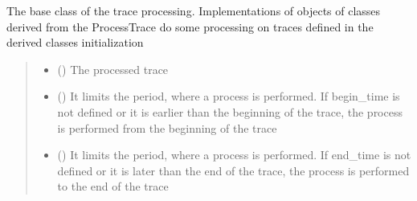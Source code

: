\documentclass[letterpaper,10pt,english]{sphinxmanual}
\begin{document}
\begin{fulllineitems}
\label{\detokenize{api_core:amw.core.utils.ProcessTrace}}
\pysigstartsignatures
{}
\pysigstopsignatures
\sphinxAtStartPar
The base class of the trace processing. Implementations of objects of classes derived from the ProcessTrace
do some processing on traces defined in the derived classes initialization
\begin{quote}\begin{description}
\begin{itemize}
\item {} 
\sphinxAtStartPar
{} () \textendash{} The processed trace

\item {} 
\sphinxAtStartPar
{} () \textendash{} It limits the period, where a process is performed.
If begin\_time is not defined or it is earlier than the beginning of the trace,
the process is performed from the beginning of the trace

\item {} 
\sphinxAtStartPar
{} () \textendash{} It limits the period, where a process is performed.
If end\_time is not defined or it is later than the end of the trace,
the process is performed to the end of the trace

\end{itemize}

\end{description}\end{quote}

\end{fulllineitems}

\end{document}
